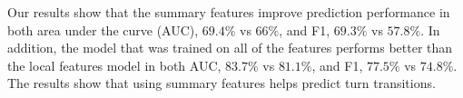 Our results show that the summary features improve prediction performance in both area under the curve (AUC), $69.4\%$ vs $66\%$, and F1, $69.3\%$ vs $57.8\%$. In addition, the model that was trained on all of the features performs better than the local features model in both AUC, $83.7\%$ vs $81.1\%$, and F1, $77.5\%$ vs $74.8\%$. The results show that using summary features helps predict turn transitions.

